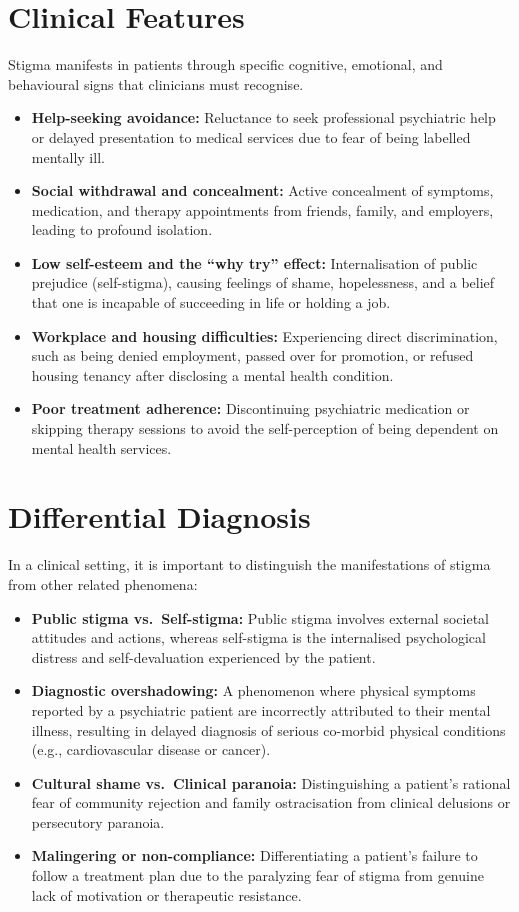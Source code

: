 \section*{Clinical Features}
Stigma manifests in patients through specific cognitive, emotional, and behavioural signs that clinicians must recognise.
\begin{itemize}
    \item \textbf{Help-seeking avoidance:} Reluctance to seek professional psychiatric help or delayed presentation to medical services due to fear of being labelled mentally ill.
    \item \textbf{Social withdrawal and concealment:} Active concealment of symptoms, medication, and therapy appointments from friends, family, and employers, leading to profound isolation.
    \item \textbf{Low self-esteem and the ``why try'' effect:} Internalisation of public prejudice (self-stigma), causing feelings of shame, hopelessness, and a belief that one is incapable of succeeding in life or holding a job.
    \item \textbf{Workplace and housing difficulties:} Experiencing direct discrimination, such as being denied employment, passed over for promotion, or refused housing tenancy after disclosing a mental health condition.
    \item \textbf{Poor treatment adherence:} Discontinuing psychiatric medication or skipping therapy sessions to avoid the self-perception of being dependent on mental health services.
\end{itemize}

\section*{Differential Diagnosis}
In a clinical setting, it is important to distinguish the manifestations of stigma from other related phenomena:
\begin{itemize}
    \item \textbf{Public stigma vs.\ Self-stigma:} Public stigma involves external societal attitudes and actions, whereas self-stigma is the internalised psychological distress and self-devaluation experienced by the patient.
    \item \textbf{Diagnostic overshadowing:} A phenomenon where physical symptoms reported by a psychiatric patient are incorrectly attributed to their mental illness, resulting in delayed diagnosis of serious co-morbid physical conditions (e.g., cardiovascular disease or cancer).
    \item \textbf{Cultural shame vs.\ Clinical paranoia:} Distinguishing a patient's rational fear of community rejection and family ostracisation from clinical delusions or persecutory paranoia.
    \item \textbf{Malingering or non-compliance:} Differentiating a patient's failure to follow a treatment plan due to the paralyzing fear of stigma from genuine lack of motivation or therapeutic resistance.
\end{itemize}


